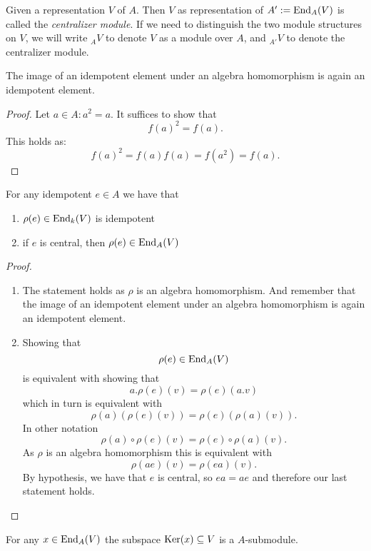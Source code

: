 \begin{defn}
Given a representation \(V\) of \(A\). Then \(V\) as representation of \(A':=\operatorname{End}_A(V)\) is called the \emph{centralizer module}. If we need to distinguish the two module structures on \(V\), we will write \(_AV\) to denote \(V\) as a module over \(A\), and \(_{A'}V\) to denote the centralizer module.
\end{defn}

\begin{prop}
The image of an idempotent element under an algebra homomorphism is again an idempotent element.
\end{prop}

\begin{proof}
Let \(a\in A:a^2=a\). It suffices to show that
\[
f(a)^2=f(a).
\]
This holds as:
\[
f(a)^2=f(a)f(a)=f(a^2)=f(a).
\]
\end{proof}

\begin{prop}
For any idempotent \(e\in A\) we have that

\begin{enumerate}
  \item \(\rho (e)\in \operatorname{End}_{k}(V)\) is idempotent
  \item if \(e\) is central, then \(\rho (e)\in \operatorname{End}_A(V)\)
\end{enumerate}
\end{prop}


\begin{proof}

\begin{enumerate}
  \item The statement holds as \(\rho \) is an algebra homomorphism. And remember that the image of an idempotent element under an algebra homomorphism is again an idempotent element.
  \item Showing that
\[
\rho (e)\in \operatorname{End}_A(V)
\]
is equivalent with showing that
\[
a.\rho (e)(v)=\rho (e)(a.v)
\]
which in turn is equivalent with
\[
\rho (a)(\rho (e)(v))=\rho (e)(\rho (a)(v)).
\]
In other notation
\[
\rho (a)\circ \rho (e)(v)=\rho (e)\circ \rho (a)(v).
\]
As \(\rho \) is an algebra homomorphism this is equivalent with
\[
\rho (ae)(v)=\rho (ea)(v).
\]
By hypothesis, we have that \(e\) is central, so \(ea=ae\) and therefore our last statement holds. 
\end{enumerate}
\end{proof}


\begin{prop}
For any \(x\in \operatorname{End}_A(V)\) the subspace \(\operatorname{Ker}(x)\subseteq V\) is a \(A\)-submodule.
\end{prop}

